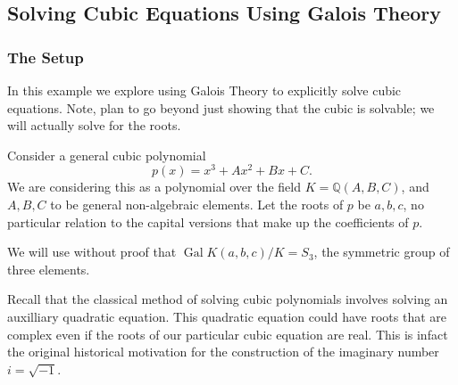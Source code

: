 \subsection{Solving Cubic Equations Using Galois Theory}

\newcommand {\Gal}{\operatorname{Gal}}

\subsubsection*{The Setup}

In this example we explore using Galois Theory to explicitly solve cubic equations.
Note, plan to go beyond just showing that the cubic is solvable; we will actually
solve for the roots.

Consider a general cubic polynomial
\begin{equation}
p(x) = x^3 + Ax^2 + Bx + C.
\end{equation}
We are considering this as a polynomial over the field \(K = \mathbb Q(A, B, C)\), and 
\(A, B, C\) to be general non-algebraic elements. Let the roots of \(p\) be \(a, b, c\),
no particular relation to the capital versions that make up the coefficients of \(p\).

We will use without proof that \(\Gal K(a, b, c) / K = S_3\), the symmetric group of three
elements.

Recall that the classical method of solving cubic polynomials involves solving an auxilliary
quadratic equation. This quadratic equation could have roots that are complex even if the
roots of our particular cubic equation are real. This is infact the original historical motivation
for the construction of the imaginary number \(i = \sqrt{-1}\).


